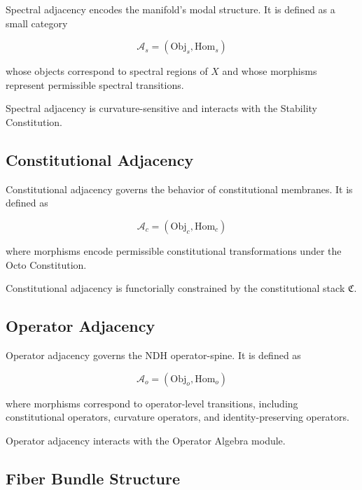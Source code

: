 Spectral adjacency encodes the manifold's modal structure. It is defined as
a small category

\[
\mathcal{A}_s = (\mathrm{Obj}_s, \mathrm{Hom}_s)
\]

whose objects correspond to spectral regions of $X$ and whose morphisms
represent permissible spectral transitions.

Spectral adjacency is curvature-sensitive and interacts with the Stability
Constitution.


\subsection{Constitutional Adjacency}

Constitutional adjacency governs the behavior of constitutional membranes.
It is defined as

\[
\mathcal{A}_c = (\mathrm{Obj}_c, \mathrm{Hom}_c)
\]

where morphisms encode permissible constitutional transformations under the
Octo Constitution.

Constitutional adjacency is functorially constrained by the constitutional
stack $\mathfrak{C}$.


\subsection{Operator Adjacency}

Operator adjacency governs the NDH operator-spine. It is defined as

\[
\mathcal{A}_o = (\mathrm{Obj}_o, \mathrm{Hom}_o)
\]

where morphisms correspond to operator-level transitions, including
constitutional operators, curvature operators, and identity-preserving
operators.

Operator adjacency interacts with the Operator Algebra module.


\subsection{Fiber Bundle Structure}

